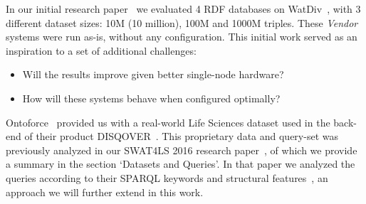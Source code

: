 %
%
%


In our initial research paper~\cite{de2016big} we evaluated 4 RDF databases on WatDiv~\cite{alucc2014diversified}, with 3 different dataset sizes: 10M (10 million), 100M and 1000M triples. These \emph{Vendor} systems were run as-is, without any configuration. 
This initial work served as an inspiration to a set of additional challenges:

\begin{itemize}
	\item Will the results improve given better single-node hardware?
	\item How will these systems behave when configured optimally?
\end{itemize}

Ontoforce~\cite{ontoforcewebsite} provided us with a real-world Life \mbox{Sciences} dataset used in the back-end of their product \mbox{DISQOVER~\cite{disqover}}. This proprietary data and query-set was previously analyzed in our SWAT4LS 2016 research paper~\cite{dewitte_swat4ls_2016}, of which we provide a summary in the section `Datasets and Queries'. 
In that paper we analyzed the queries according to their SPARQL keywords and structural features~\cite{DBLP:journals/corr/abs-1103-5043}, an approach we will further extend in this work. 

